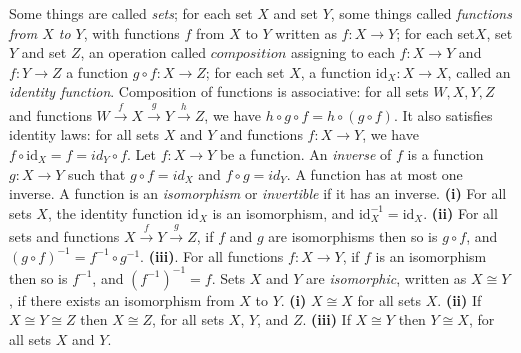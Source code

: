  Some things are called \textit{sets}; for each set $X$ and set $Y$, some things called \textit{functions from $X$ to $Y$}, with functions $f$ from $X$ to $Y$ written as $f \colon X \to Y$; for each set$X$, set $Y$ and set $Z$, an operation called $composition$ assigning to each $f \colon X \to Y$ and $f \colon Y \to Z$ a function $g \circ f \colon X \to Z$; for each set $X$, a function $\text{id}_X \colon X \to X$, called an \textit{identity function}.
 Composition of functions is associative: for all sets $W, X, Y, Z$ and functions $W \xrightarrow{f} X \xrightarrow{g} Y \xrightarrow{h} Z$, we have $h \circ g \circ f = h \circ (g \circ f)$. It also satisfies identity laws: for all sets $X$ and $Y$ and functions $f \colon X \to Y$, we have $f \circ \text{id}_X = f = id_Y \circ f$.
 Let $f \colon X \to Y$ be a function. An \textit{inverse} of $f$ is a function $g \colon X \to Y$ such that $g \circ f = id_X$ and $f \circ g = id_Y$.
 A function has at most one inverse.
 A function is an \textit{isomorphism} or \textit{invertible} if it has an inverse.
 \textbf{(i)} For all sets $X$, the identity function $\text{id}_X$ is an isomorphism, and $\text{id}_X^{-1} = \text{id}_X$. \textbf{(ii)} For all sets and functions $X \xrightarrow{f} Y \xrightarrow{g} Z$, if $f$ and $g$ are  isomorphisms then so is $g \circ f$, and $(g \circ f)^{-1} = f^{-1} \circ g^{-1}$. \textbf{(iii)}. For all functions $f \colon X \to Y$, if $f$ is an isomorphism then so is $f^{-1}$, and
$(f^{-1})^{-1} = f$.
 Sets $X$ and $Y$ are \textit{isomorphic}, written as $X \cong Y$, if there exists an isomorphism from $X$ to $Y$.
 \textbf{(i)} $X \cong X$ for all sets $X$. \textbf{(ii)} If $X \cong Y \cong Z$ then $X \cong Z$, for all sets $X$, $Y$, and $Z$. \textbf{(iii)} If $X \cong Y$ then $Y \cong X$, for all sets $X$ and $Y$.
